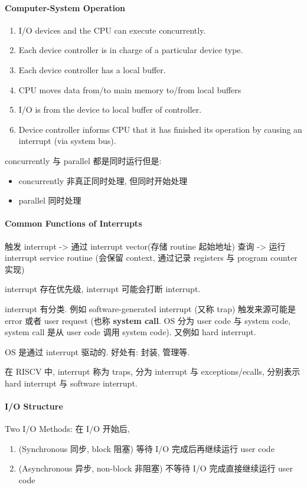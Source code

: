 \paragraph{Computer-System Operation}\quad

\begin{enumerate}
    \item I/O devices and the CPU can execute concurrently. 
    \item Each device controller is in charge of a particular device type.
    \item Each device controller has a local buffer.
    \item CPU moves data from/to main memory to/from local buffers
    \item I/O is from the device to local buffer of controller.
    \item Device controller informs CPU that it has finished its operation by causing an interrupt (via system bus).
\end{enumerate}


concurrently 与 parallel 都是同时运行但是:
\begin{itemize}
    \item concurrently 非真正同时处理, 但同时开始处理
    \item parallel 同时处理
\end{itemize}

\paragraph{Common Functions of Interrupts}触发 interrupt -> 通过 interrupt vector(存储 routine 起始地址) 查询 -> 运行 interrupt service routine (会保留 context, 通过记录 registers 与 program counter 实现)

interrupt 存在优先级, interrupt 可能会打断 interrupt. 

interrupt 有分类. 例如 software-generated interrupt (又称 trap) 触发来源可能是 error 或者 user request (也称 \textbf{system call}. OS 分为 user code 与 system code, system call 是从 user code 调用 system code). 又例如 hard interrupt. 

OS 是通过 interrupt 驱动的. 好处有: 封装, 管理等. 

在 RISCV 中, interrupt 称为 traps, 分为 interrupt 与 exceptions/ecalls, 分别表示 hard interrupt 与 software interrupt. 

\paragraph{I/O Structure}Two I/O Methods: 在 I/O 开始后,
\begin{enumerate}
    \item (Synchronous 同步, block 阻塞) 等待 I/O 完成后再继续运行 user code 
    \item (Asynchronous 异步, non-block 非阻塞) 不等待 I/O 完成直接继续运行 user code
\end{enumerate}

